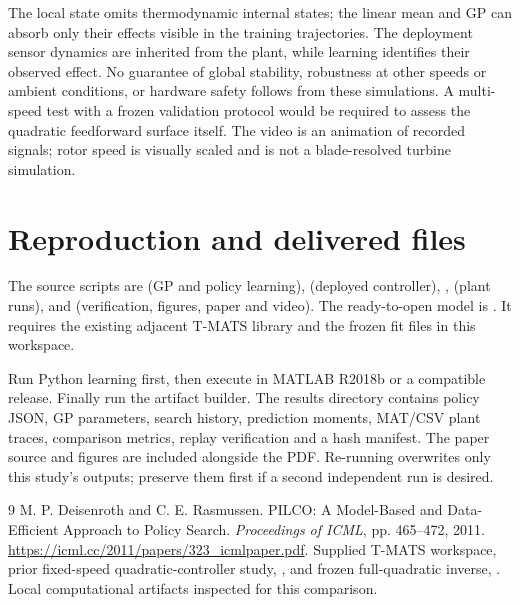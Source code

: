 \documentclass[11pt,a4paper]{article}
\begin{document}
The local state omits thermodynamic internal states; the linear mean and GP can absorb only their effects visible in the training trajectories. The deployment sensor dynamics are inherited from the plant, while learning identifies their observed effect. No guarantee of global stability, robustness at other speeds or ambient conditions, or hardware safety follows from these simulations. A multi-speed test with a frozen validation protocol would be required to assess the quadratic feedforward surface itself. The video is an animation of recorded signals; rotor speed is visually scaled and is not a blade-resolved turbine simulation.

\section{Reproduction and delivered files}
The source scripts are  (GP and policy learning),  (deployed controller), ,  (plant runs), and  (verification, figures, paper and video). The ready-to-open model is . It requires the existing adjacent T-MATS library and the frozen fit files in this workspace.

Run Python learning first, then execute  in MATLAB R2018b or a compatible release. Finally run the artifact builder. The results directory contains policy JSON, GP parameters, search history, prediction moments, MAT/CSV plant traces, comparison metrics, replay verification and a hash manifest. The paper source and figures are included alongside the PDF. Re-running overwrites only this study's outputs; preserve them first if a second independent run is desired.

\begin{thebibliography}{9}
 M. P. Deisenroth and C. E. Rasmussen. PILCO: A Model-Based and Data-Efficient Approach to Policy Search. \emph{Proceedings of ICML}, pp. 465--472, 2011. \url{https://icml.cc/2011/papers/323_icmlpaper.pdf}.
 Supplied T-MATS workspace, prior fixed-speed quadratic-controller study, , and frozen full-quadratic inverse, . Local computational artifacts inspected for this comparison.
\end{thebibliography}
\end{document}
